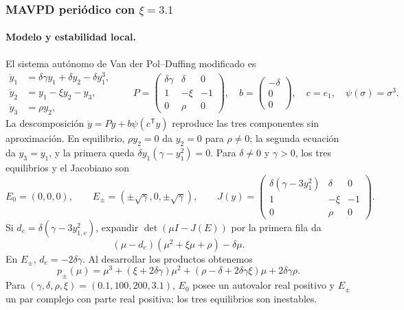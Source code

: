 \subsubsection{MAVPD periódico con \texorpdfstring{\(\xi=3.1\)}{xi=3.1}}

\paragraph{Modelo y estabilidad local.}
El sistema autónomo de Van der Pol--Duffing modificado
\cite{matouk2023} es
\begin{equation}
 \begin{aligned}
  \dot y_1&=\delta\gamma y_1+\delta y_2-\delta y_1^3,\\
  \dot y_2&=y_1-\xi y_2-y_3,\\
  \dot y_3&=\rho y_2,
 \end{aligned}
 \qquad
 P=\begin{pmatrix}
 \delta\gamma&\delta&0\\1&-\xi&-1\\0&\rho&0
 \end{pmatrix},\quad
 b=\begin{pmatrix}-\delta\\0\\0\end{pmatrix},\quad
 c=e_1,\quad \psi(\sigma)=\sigma^3.
 \label{ncbench:eq:mavpd-lure}
\end{equation}
La descomposición \(\dot y=Py+b\psi(c^{\mathsf T}y)\) reproduce las tres
componentes sin aproximación. En equilibrio, \(\rho y_2=0\) da \(y_2=0\)
para \(\rho\ne0\); la segunda ecuación da \(y_3=y_1\), y la primera queda
\(\delta y_1(\gamma-y_1^2)=0\). Para \(\delta\ne0\) y \(\gamma>0\),
los tres equilibrios y el Jacobiano son
\begin{equation}
 E_0=(0,0,0),\qquad
 E_\pm=(\pm\sqrt{\gamma},0,\pm\sqrt{\gamma}),\qquad
 J(y)=\begin{pmatrix}
 \delta(\gamma-3y_1^2)&\delta&0\\
 1&-\xi&-1\\0&\rho&0
 \end{pmatrix}.
 \label{ncbench:eq:mavpd-equilibria-jacobian}
\end{equation}
Si \(d_e=\delta(\gamma-3y_{1,e}^2)\), expandir
\(\det(\mu I-J(E))\) por la primera fila da
\[
 (\mu-d_e)(\mu^2+\xi\mu+\rho)-\delta\mu.
\]
En \(E_\pm\), \(d_e=-2\delta\gamma\). Al desarrollar los productos
obtenemos
\begin{equation}
 p_\pm(\mu)=\mu^3+(\xi+2\delta\gamma)\mu^2
 +(\rho-\delta+2\delta\gamma\xi)\mu+2\delta\gamma\rho.
 \label{ncbench:eq:mavpd-local-polynomial}
\end{equation}
Para \((\gamma,\delta,\rho,\xi)=(0.1,100,200,3.1)\), \(E_0\) posee un
autovalor real positivo y \(E_\pm\) un par complejo con parte real positiva;
los tres equilibrios son inestables.

